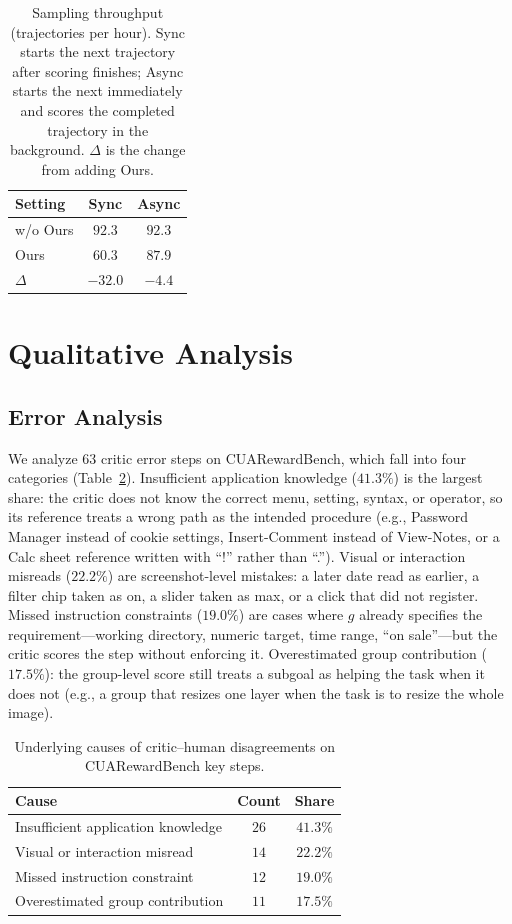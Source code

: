 \begin{table}[h]
\caption{Sampling throughput (trajectories per hour). Sync starts the next trajectory after scoring finishes; Async starts the next immediately and scores the completed trajectory in the background. $\Delta$ is the change from adding Ours.}
\label{tab:efficiency-rl}
\centering
\small
\begin{tabular}{lcc}
\toprule
Setting & Sync & Async \\
\midrule
w/o Ours & $\mathbf{92.3}$ & $\mathbf{92.3}$ \\
Ours & $60.3$ & $87.9$ \\
\midrule
$\Delta$ & $-32.0$ & $-4.4$ \\
\bottomrule
\end{tabular}
\end{table}

\section{Qualitative Analysis}
\label{app:qual}

\subsection{Error Analysis}
\label{app:error}

We analyze $63$ critic error steps on CUARewardBench, which fall into four categories (Table~\ref{tab:error-causes}).
Insufficient application knowledge ($41.3\%$) is the largest share: the critic does not know the correct menu, setting, syntax, or operator, so its reference treats a wrong path as the intended procedure (e.g., Password Manager instead of cookie settings, Insert-Comment instead of View-Notes, or a Calc sheet reference written with ``!'' rather than ``.'').
Visual or interaction misreads ($22.2\%$) are screenshot-level mistakes: a later date read as earlier, a filter chip taken as on, a slider taken as max, or a click that did not register.
Missed instruction constraints ($19.0\%$) are cases where $g$ already specifies the requirement---working directory, numeric target, time range, ``on sale''---but the critic scores the step without enforcing it.
Overestimated group contribution ($17.5\%$): the group-level score still treats a subgoal as helping the task when it does not (e.g., a group that resizes one layer when the task is to resize the whole image).

\begin{table}[h]
\caption{Underlying causes of critic--human disagreements on CUARewardBench key steps.}
\label{tab:error-causes}
\centering
\small
\begin{tabular}{lcc}
\toprule
Cause & Count & Share \\
\midrule
Insufficient application knowledge & $26$ & $41.3\%$ \\
Visual or interaction misread & $14$ & $22.2\%$ \\
Missed instruction constraint & $12$ & $19.0\%$ \\
Overestimated group contribution & $11$ & $17.5\%$ \\
\bottomrule
\end{tabular}
\end{table}

